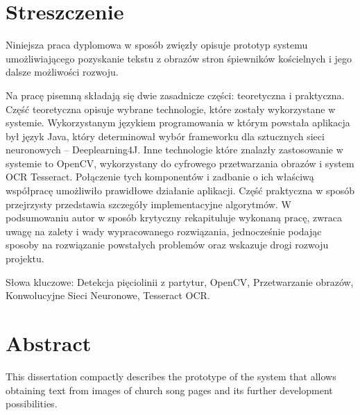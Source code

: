 \documentclass[a4paper,12pt]{article}
\newcommand\spacingIndent{2.2em}
\begin{document}
	\setcounter{page}{2}
	\begin{spacing}{1.35}
	    \noindent\begin{minipage}[s]{\textwidth}
            \tableofcontents
        \end{minipage}
    \end{spacing}
	\newpage 
	
\begin{spacing}{1.45}
\section*{Streszczenie}
	     \hspace{\spacingIndent} Niniejsza praca dyplomowa w sposób            zwięzły opisuje prototyp systemu umożliwiającego       pozyskanie tekstu z obrazów stron śpiewników kościelnych i     jego dalsze możliwości rozwoju. 
	     
         Na pracę pisemną składają się dwie zasadnicze części:        teoretyczna i praktyczna. Część teoretyczna opisuje           wybrane technologie, które zostały wykorzystane w             systemie. Wykorzystanym językiem programowania w którym powstała aplikacja był język Java, który determinował wybór frameworku dla sztucznych sieci neuronowych -- Deeplearning4J. Inne technologie które znalazły zastosowanie w systemie to OpenCV, wykorzystany do cyfrowego przetwarzania obrazów i system OCR Tesseract. Połączenie tych komponentów i zadbanie o ich właściwą współpracę umożliwiło prawidłowe działanie aplikacji. Część praktyczna w sposób przejrzysty           przedstawia szczegóły implementacyjne algorytmów. W podsumowaniu        autor w sposób krytyczny rekapituluje wykonaną pracę,          zwraca uwagę na zalety i wady wypracowanego                rozwiązania, jednocześnie podając sposoby na rozwiązanie      powstałych problemów oraz wskazuje drogi           rozwoju projektu.   
         
         Słowa kluczowe: Detekcja pięciolinii z partytur, OpenCV, Przetwarzanie obrazów, Konwolucyjne Sieci Neuronowe, Tesseract OCR.
	\section*{Abstract}
    \hspace{\spacingIndent} This dissertation compactly describes the prototype of the system that allows obtaining text from images of church song pages and its further development possibilities.


\end{spacing}
\end{document}
